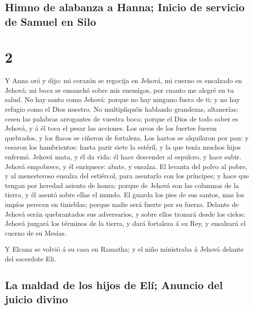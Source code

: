 \hypertarget{himno-de-alabanza-a-hanna-inicio-de-servicio-de-samuel-en-silo}{%
\subsection{Himno de alabanza a Hanna; Inicio de servicio de Samuel en
Silo}\label{himno-de-alabanza-a-hanna-inicio-de-servicio-de-samuel-en-silo}}

\hypertarget{section-1}{%
\section{2}\label{section-1}}

 Y Anna oró y dijo: mi corazón se regocija en Jehová, mi
cuerno es ensalzado en Jehová; mi boca se ensanchó sobre mis enemigos,
por cuanto me alegré en tu salud.  No hay santo como
Jehová: porque no hay ninguno fuera de ti; y no hay refugio como el Dios
nuestro.  No multipliquéis hablando grandezas, altanerías;
cesen las palabras arrogantes de vuestra boca; porque el Dios de todo
saber es Jehová, y á él toca el pesar las acciones.  Los
arcos de los fuertes fueron quebrados, y los flacos se ciñeron de
fortaleza.  Los hartos se alquilaron por pan: y cesaron
los hambrientos: hasta parir siete la estéril, y la que tenía muchos
hijos enfermó.  Jehová mata, y él da vida: él hace
descender al sepulcro, y hace subir.  Jehová empobrece, y
él enriquece: abate, y ensalza.  El levanta del polvo al
pobre, y al menesteroso ensalza del estiércol, para asentarlo con los
príncipes; y hace que tengan por heredad asiento de honra: porque de
Jehová son las columnas de la tierra, y él asentó sobre ellas el mundo.
 El guarda los pies de sus santos, mas los impíos perecen
en tinieblas; porque nadie será fuerte por su fuerza. 
Delante de Jehová serán quebrantados sus adversarios, y sobre ellos
tronará desde los cielos: Jehová juzgará los términos de la tierra, y
dará fortaleza á su Rey, y ensalzará el cuerno de su Mesías.

 Y Elcana se volvió á su casa en Ramatha; y el niño
ministraba á Jehová delante del sacerdote Eli.

\hypertarget{la-maldad-de-los-hijos-de-eluxed-anuncio-del-juicio-divino}{%
\subsection{La maldad de los hijos de Elí; Anuncio del juicio
divino}\label{la-maldad-de-los-hijos-de-eluxed-anuncio-del-juicio-divino}}

